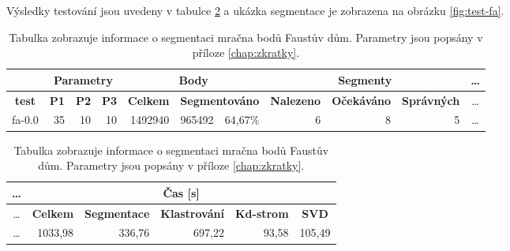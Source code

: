 \documentclass[11pt,twoside,a4paper]{book}
\begin{document}
Výsledky testování jsou uvedeny v tabulce \ref{table:test-fa} a ukázka segmentace je zobrazena na obrázku \ref{fig:test-fa}.

\begin{table}[ht]
\resizebox{\textwidth}{!} {
\begin{tabular}{|l|r|r|r|r|r|r|r|r|r|c|}
\hline
\textbf{} & \multicolumn{ 3}{c|}{\textbf{Parametry}} & \multicolumn{ 3}{c|}{\textbf{Body}} & \multicolumn{ 3}{c|}{\textbf{Segmenty}} &\ldots \\ \hline
\multicolumn{1}{|c|}{\textbf{test}} & \textbf{P1} & \multicolumn{1}{c|}{\textbf{P2}} & \multicolumn{1}{c|}{\textbf{P3}} & \textbf{Celkem} & \multicolumn{ 2}{c|}{\textbf{Segmentováno}} & \textbf{Nalezeno} & \multicolumn{1}{c|}{\textbf{Očekáváno }} & \multicolumn{1}{c|}{\textbf{Správných}} &\ldots\\ \hline
fa-0.0 & \multicolumn{1}{r|}{35} & \multicolumn{1}{r|}{10} & \multicolumn{1}{r|}{10} & \multicolumn{1}{r|}{1492940} & \multicolumn{1}{r|}{965492} & \multicolumn{1}{r|}{64,67\%} & \multicolumn{1}{r|}{6} & \multicolumn{1}{r|}{8} & \multicolumn{1}{r|}{5} &\ldots\\ \hline
\end{tabular}

}
\begin{flushright} \scalebox{0.9} {
\begin{tabular}{|c|r|r|r|r|r|}
\hline
\ldots& \multicolumn{ 5}{|c|}{\textbf{Čas [s]}} \\ \hline
\ldots& \textbf{Celkem} & \multicolumn{1}{c|}{\textbf{Segmentace}} & \multicolumn{1}{c|}{\textbf{Klastrování}} & \multicolumn{1}{c|}{\textbf{Kd-strom}} & \multicolumn{1}{c|}{\textbf{SVD}} \\ \hline
\ldots& \multicolumn{1}{|r|}{1033,98} & \multicolumn{1}{r|}{336,76} & \multicolumn{1}{r|}{697,22} & \multicolumn{1}{r|}{93,58} & \multicolumn{1}{r|}{105,49} \\ \hline
\end{tabular}
}\end{flushright}

\caption{Tabulka zobrazuje informace o segmentaci mračna bodů Faustův dům. Parametry jsou popsány v příloze \ref{chap:zkratky}.} 
\label{table:test-fa}
\end{table}
\end{document}
